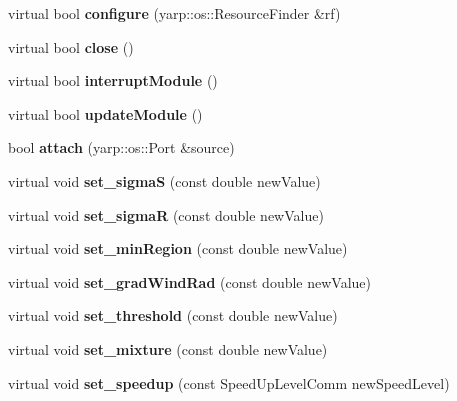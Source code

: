 \begin{DoxyCompactItemize}
\item 
virtual bool {\bfseries configure} (yarp\+::os\+::\+Resource\+Finder \&rf)\label{classEdisonSegmModule_adff5acfcb2411234172937f50071f747}

\item 
virtual bool {\bfseries close} ()\label{classEdisonSegmModule_a01831b02110aa3c2dfb2ae2a235f32c8}

\item 
virtual bool {\bfseries interrupt\+Module} ()\label{classEdisonSegmModule_a050c4fd290134b2c549f1f255b39e3fa}

\item 
virtual bool {\bfseries update\+Module} ()\label{classEdisonSegmModule_a9ec945c0f1cd4246d94255c9d58bbd4f}

\item 
bool {\bfseries attach} (yarp\+::os\+::\+Port \&source)\label{classEdisonSegmModule_a1ac9b550e805a1e1dff863205b70e553}

\item 
virtual void {\bfseries set\+\_\+sigma\+S} (const double new\+Value)\label{classEdisonSegmModule_a9331b900b7671ad851f9aa3b4159e0cf}

\item 
virtual void {\bfseries set\+\_\+sigma\+R} (const double new\+Value)\label{classEdisonSegmModule_a26d36ebd0382e29033d6b4764b1cfb33}

\item 
virtual void {\bfseries set\+\_\+min\+Region} (const double new\+Value)\label{classEdisonSegmModule_a9f4a7a594ff5ee50d330cb964dd9b48f}

\item 
virtual void {\bfseries set\+\_\+grad\+Wind\+Rad} (const double new\+Value)\label{classEdisonSegmModule_a6add88774ea4794f278988a44d4a64c2}

\item 
virtual void {\bfseries set\+\_\+threshold} (const double new\+Value)\label{classEdisonSegmModule_a63a8a762fcad79343218570b175b755d}

\item 
virtual void {\bfseries set\+\_\+mixture} (const double new\+Value)\label{classEdisonSegmModule_a0993cc82cbd9dfb774e69e40a236787a}

\item 
virtual void {\bfseries set\+\_\+speedup} (const Speed\+Up\+Level\+Comm new\+Speed\+Level)\label{classEdisonSegmModule_af35d584ee6446611e1c483897c86f1fc}


\end{DoxyCompactItemize}
